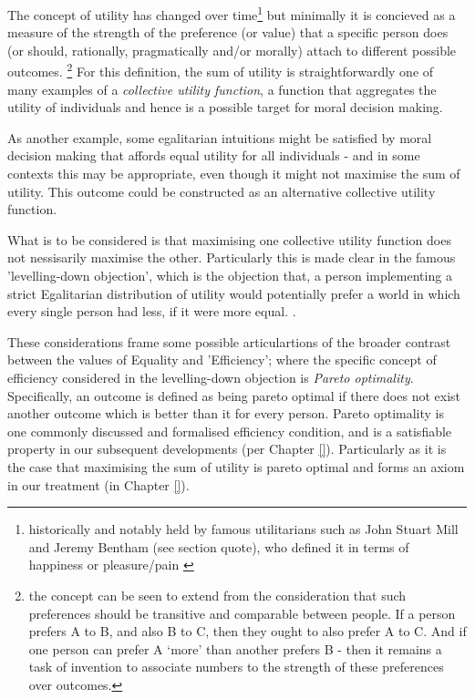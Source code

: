 The concept of utility has changed over time\footnote{historically and notably held by famous utilitarians such as John Stuart Mill\cite{MillGutenberg} and Jeremy Bentham (see section quote), who defined it in terms of happiness or pleasure/pain \cite{bentham2007introduction}}
but minimally it is concieved as a measure of the strength of the preference (or value) that a specific person does (or should, rationally, pragmatically and/or morally) attach to different possible outcomes.%
\footnote{the concept can be seen to extend from the consideration that such preferences should be transitive and comparable between people. If a person prefers A to B, and also B to C, then they ought to also prefer A to C. And if one person can prefer A `more' than another prefers B - then it remains a task of invention to associate numbers to the strength of these preferences over outcomes.}
For this definition, the sum of utility is straightforwardly one of many examples of a \textit{collective utility function}, a function that aggregates the utility of individuals and hence is a possible target for moral decision making.\cite{TheoriesofValueAggregation}

As another example, some egalitarian intuitions might be satisfied by moral decision making that affords equal utility for all individuals - and in some contexts this may be appropriate, even though it might not maximise the sum of utility. This outcome could be constructed as an alternative collective utility function.

What is to be considered is that maximising one collective utility function does not nessisarily maximise the other.
Particularly this is made clear in the famous 'levelling-down objection', which is the objection that, a person implementing a strict Egalitarian distribution of utility would potentially prefer a world in which every single person had less, if it were more equal. \cite{temkin_2003, equalityandpriorityparfit}.

These considerations frame some possible articulartions of the broader contrast between the values of Equality and 'Efficiency'; where the specific concept of efficiency considered in the levelling-down objection is \textit{Pareto optimality}.
Specifically, an outcome is defined as being pareto optimal if there does not exist another outcome which is better than it for every person.
Pareto optimality is one commonly discussed and formalised efficiency condition, and is a satisfiable property in our subsequent developments (per Chapter \ref{}).
Particularly as it is the case that maximising the sum of utility is pareto optimal \cite{TheoriesofValueAggregation} and forms an axiom in our treatment (in Chapter \ref{}).

